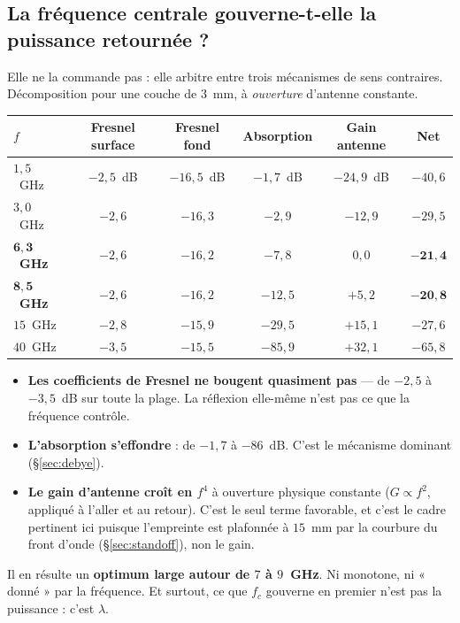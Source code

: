 \documentclass[11pt,a4paper]{article}
\begin{document}
\subsection{La fréquence centrale gouverne-t-elle la puissance retournée ?}

Elle ne la commande pas : elle arbitre entre trois mécanismes de sens
contraires. Décomposition pour une couche de $3$~mm, à \emph{ouverture}
d'antenne constante.

\begin{table}[h]
\centering
\begin{tabular}{lccccc}
\toprule
$f$ & Fresnel surface & Fresnel fond & Absorption & Gain antenne & \textbf{Net} \\
\midrule
$1{,}5$~GHz & $-2{,}5$~dB & $-16{,}5$~dB & $-1{,}7$~dB & $-24{,}9$~dB
  & $-40{,}6$ \\
$3{,}0$~GHz & $-2{,}6$ & $-16{,}3$ & $-2{,}9$ & $-12{,}9$ & $-29{,}5$ \\
$\mathbf{6{,}3}$~\textbf{GHz} & $-2{,}6$ & $-16{,}2$ & $-7{,}8$ & $0{,}0$
  & $\mathbf{-21{,}4}$ \\
$\mathbf{8{,}5}$~\textbf{GHz} & $-2{,}6$ & $-16{,}2$ & $-12{,}5$ & $+5{,}2$
  & $\mathbf{-20{,}8}$ \\
$15$~GHz & $-2{,}8$ & $-15{,}9$ & $-29{,}5$ & $+15{,}1$ & $-27{,}6$ \\
$40$~GHz & $-3{,}5$ & $-15{,}5$ & $-85{,}9$ & $+32{,}1$ & $-65{,}8$ \\
\bottomrule
\end{tabular}
\end{table}

\begin{itemize}
\item \textbf{Les coefficients de Fresnel ne bougent quasiment pas} --- de
      $-2{,}5$ à $-3{,}5$~dB sur toute la plage. La réflexion elle-même n'est
      pas ce que la fréquence contrôle.
\item \textbf{L'absorption s'effondre} : de $-1{,}7$ à $-86$~dB. C'est le
      mécanisme dominant (\S\ref{sec:debye}).
\item \textbf{Le gain d'antenne croît en $f^4$} à ouverture physique constante
      ($G \propto f^2$, appliqué à l'aller et au retour). C'est le seul terme
      favorable, et c'est le cadre pertinent ici puisque l'empreinte est
      plafonnée à $15$~mm par la courbure du front d'onde
      (\S\ref{sec:standoff}), non le gain.
\end{itemize}

Il en résulte un \textbf{optimum large autour de $7$ à $9$~GHz}. Ni monotone,
ni « donné » par la fréquence. Et surtout, ce que $f_c$ gouverne en premier
n'est pas la puissance : c'est $\lambda$.
\end{document}
